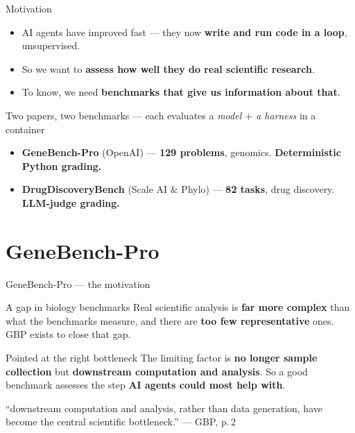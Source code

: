 \documentclass[9pt,aspectratio=169]{beamer}
\newcommand{\gd}[1]{\textcolor{unigreen}{\textbf{#1}}}
\newcommand{\rd}[1]{\textcolor{unired}{\textbf{#1}}}
\newcommand{\sm}[1]{{\color{unigrey}\small #1}}
\begin{document}
\begin{frame}{Motivation}
\begin{itemize}
  \item AI agents have improved fast --- they now \textbf{write and run code in a loop}, unsupervised.
  \item So we want to \textbf{assess how well they do real scientific research}.
  \item To know, we need \textbf{benchmarks that give us information about that}.
\end{itemize}
\vfill
\begin{block}{Two papers, two benchmarks --- each evaluates a \emph{model $+$ a harness} in a container}
\begin{itemize}\footnotesize
  \item \textbf{GeneBench-Pro} \sm{(OpenAI)} --- \textbf{129 problems}, genomics. \gd{Deterministic Python grading.}
  \item \textbf{DrugDiscoveryBench} \sm{(Scale AI \& Phylo)} --- \textbf{82 tasks}, drug discovery. \rd{LLM-judge grading.}
\end{itemize}
\end{block}
\end{frame}

\AtBeginSection[]{\outlineframe}

\section{GeneBench-Pro}

\begin{frame}{GeneBench-Pro --- the motivation}
\begin{block}{A gap in biology benchmarks}
Real scientific analysis is \textbf{far more complex} than what the benchmarks measure, and there are
\textbf{too few representative} ones. GBP exists to close that gap.
\end{block}
\bigskip
\begin{block}{Pointed at the right bottleneck}
The limiting factor is \textbf{no longer sample collection} but \textbf{downstream computation and
analysis}. So a good benchmark assesses the step \textbf{AI agents could most help with}.
\smallskip

\sm{``downstream computation and analysis, rather than data generation, have become the central
scientific bottleneck.'' --- GBP, p.\,2}
\end{block}
\end{frame}
\end{document}
